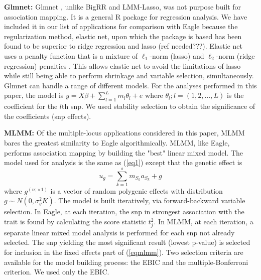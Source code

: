 \documentclass{nature}
\begin{document}
\textbf{Glmnet:} Glmnet  \cite{Friedman2010glmnet}, unlike BigRR and LMM-Lasso, was not purpose built for 
association mapping.  It is a general R package for 
regression analysis. We have included it in our list of applications for comparison with Eagle because the 
regularization method, elastic net, upon which the package is based has been found to be superior to ridge regression and 
lasso (ref needed???).  Elastic net uses a penalty function that is a mixture of 
$\ell_1$-norm (lasso) and $\ell_2$-norm (ridge regression) penalties  \cite{zou2005regularization}. 
This allows elastic net to avoid the limitations of lasso 
while still being able to perform shrinkage and variable selection, simultaneously. 
Glmnet can handle a range of different models. For the analyses performed in this paper, the model is 
$y = X \beta + \sum_{l=1}^L m_l \theta_l + e$ where $\theta_l; l=(1,2, \ldots, L)$ is the coefficient for the $l$th snp. 
We used stability selection to obtain the significance of the coefficients (snp effects). 


\textbf{MLMM:} Of the multiple-locus applications considered in this paper, 
MLMM \cite{segura2012efficient} bares the greatest similarity to Eagle algorithmically.  MLMM, like Eagle, performs 
association mapping by building the "best" linear mixed model.  The model used for analysis 
is the same as (\ref{eq1}) except that the genetic effect is 
\begin{equation}
\label{eqmlmm}
u_g = \sum_{k=1}^s  m_{S_k} a_{S_k} + g
\end{equation}
where 
$g^{(n ; \times 1)}$ is a vector of random polygenic effects with distribution 
$g \sim N(0, \sigma^2_g K)$. The model is built iteratively, via forward-backward variable selection.  In Eagle, at each iteration, 
the snp in strongest association with the trait is found by calculating the score statistic $t_j^2$.  In MLMM, at each iteration, 
a separate linear mixed model analysis is performed for each snp not already selected. The snp yielding the most 
significant result (lowest p-value) is selected for inclusion in the fixed effects part of (\ref{eqmlmm}).  
Two selection 
criteria are available for the model building process: 
the EBIC and the multiple-Bonferroni criterion. We used only the EBIC. 
\end{document}
